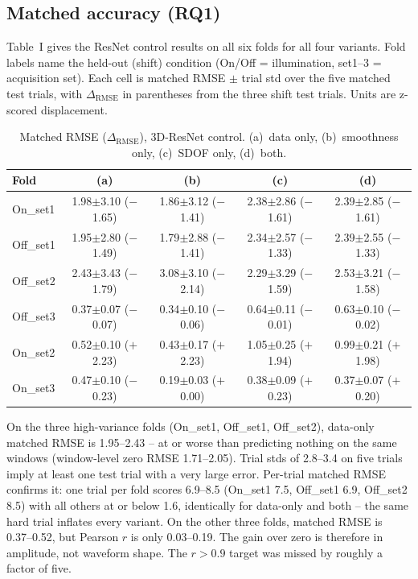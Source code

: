 \documentclass[conference]{IEEEtran}
\begin{document}
\subsection{Matched accuracy (RQ1)}
Table~I gives the ResNet control results on all six folds for all four variants. Fold labels name the held-out (shift) condition (On/Off = illumination, set1--3 = acquisition set). Each cell is matched RMSE $\pm$ trial std over the five matched test trials, with $\Delta_{\mathrm{RMSE}}$ in parentheses from the three shift test trials. Units are z-scored displacement.
\begin{table}[t]
\caption{Matched RMSE ($\Delta_{\mathrm{RMSE}}$), 3D-ResNet control. (a)~data only, (b)~smoothness only, (c)~SDOF only, (d)~both.}
\label{tab:resnet}
\centering
\begin{tabular}{lcccc}
\hline
Fold & (a) & (b) & (c) & (d) \\
\hline
On\_set1 & 1.98$\pm$3.10 ($-$1.65) & 1.86$\pm$3.12 ($-$1.41) & 2.38$\pm$2.86 ($-$1.61) & 2.39$\pm$2.85 ($-$1.61) \\
Off\_set1 & 1.95$\pm$2.80 ($-$1.49) & 1.79$\pm$2.88 ($-$1.41) & 2.34$\pm$2.57 ($-$1.33) & 2.39$\pm$2.55 ($-$1.33) \\
Off\_set2 & 2.43$\pm$3.43 ($-$1.79) & 3.08$\pm$3.10 ($-$2.14) & 2.29$\pm$3.29 ($-$1.59) & 2.53$\pm$3.21 ($-$1.58) \\
Off\_set3 & 0.37$\pm$0.07 ($-$0.07) & 0.34$\pm$0.10 ($-$0.06) & 0.64$\pm$0.11 ($-$0.01) & 0.63$\pm$0.10 ($-$0.02) \\
On\_set2 & 0.52$\pm$0.10 ($+$2.23) & 0.43$\pm$0.17 ($+$2.23) & 1.05$\pm$0.25 ($+$1.94) & 0.99$\pm$0.21 ($+$1.98) \\
On\_set3 & 0.47$\pm$0.10 ($-$0.23) & 0.19$\pm$0.03 ($+$0.00) & 0.38$\pm$0.09 ($+$0.23) & 0.37$\pm$0.07 ($+$0.20) \\
\hline
\end{tabular}
\end{table}

On the three high-variance folds (On\_set1, Off\_set1, Off\_set2), data-only matched RMSE is 1.95--2.43 -- at or worse than predicting nothing on the same windows (window-level zero RMSE 1.71--2.05). Trial stds of 2.8--3.4 on five trials imply at least one test trial with a very large error. Per-trial matched RMSE confirms it: one trial per fold scores 6.9--8.5 (On\_set1 7.5, Off\_set1 6.9, Off\_set2 8.5) with all others at or below 1.6, identically for data-only and both -- the same hard trial inflates every variant. On the other three folds, matched RMSE is 0.37--0.52, but Pearson $r$ is only 0.03--0.19. The gain over zero is therefore in amplitude, not waveform shape. The $r > 0.9$ target was missed by roughly a factor of five.
\end{document}
